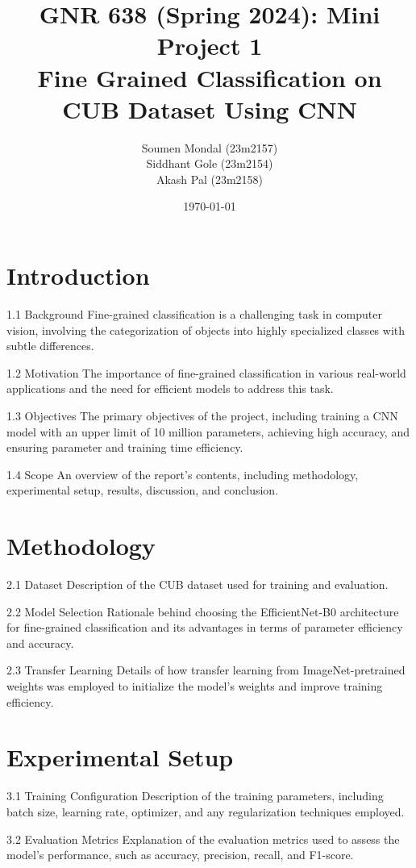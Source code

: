 \documentclass[12pt, a4paper, twoside]{article}
\title{\vspace{-0.5in}\textbf{GNR 638 (Spring 2024): Mini Project 1\\{\large Fine Grained Classification on CUB Dataset Using CNN}}}
\author{Soumen Mondal (23m2157)\\Siddhant Gole (23m2154)\\Akash Pal (23m2158)}
\date{\today}
\begin{document}
	\maketitle
	\thispagestyle{fancy}
	
	\section{Introduction}
		
		1.1 Background
		Fine-grained classification is a challenging task in computer vision, involving the categorization of objects into highly specialized classes with subtle differences.
		
		1.2 Motivation
		The importance of fine-grained classification in various real-world applications and the need for efficient models to address this task.
		
		1.3 Objectives
		The primary objectives of the project, including training a CNN model with an upper limit of 10 million parameters, achieving high accuracy, and ensuring parameter and training time efficiency.
		
		1.4 Scope
		An overview of the report's contents, including methodology, experimental setup, results, discussion, and conclusion.
		
	\section{Methodology}
		
		2.1 Dataset
		Description of the CUB dataset used for training and evaluation.
		
		2.2 Model Selection
		Rationale behind choosing the EfficientNet-B0 architecture for fine-grained classification and its advantages in terms of parameter efficiency and accuracy.
		
		2.3 Transfer Learning
		Details of how transfer learning from ImageNet-pretrained weights was employed to initialize the model's weights and improve training efficiency.
		
	\section{Experimental Setup}
		
		3.1 Training Configuration
		Description of the training parameters, including batch size, learning rate, optimizer, and any regularization techniques employed.
		
		3.2 Evaluation Metrics
		Explanation of the evaluation metrics used to assess the model's performance, such as accuracy, precision, recall, and F1-score.
		
\end{document}
